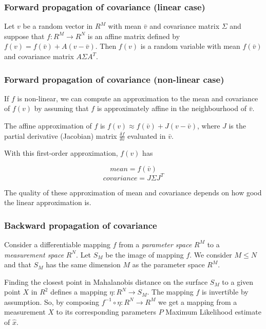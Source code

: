 \subsubsection{Forward propagation of covariance (linear case)}

Let $v$ be a random vector in $R^M$ with mean $\bar{v}$ and covariance matrix $\Sigma$ and suppose that $f : R^M \rightarrow R^N$ is an affine matrix defined by $f(v) = f(\bar{v}) + A(v - \bar{v})$.
Then $f(v)$ is a random variable with mean $f(\bar{v})$ and covariance matrix $A\Sigma A^T$.

\subsubsection{Forward propagation of covariance (non-linear case)}

If $f$ is non-linear, we can compute an approximation to the mean and covariance of $f(v)$ by assuming that $f$ is approximately affine in the neighbourhood of $\bar{v}$.

The affine approximation of $f$ is $f(v) \approx f(\bar{v}) + J(v-\bar{v})$,
where $J$ is the partial derivative (Jacobian) matrix $\frac{\delta f}{\delta v}$ evaluated in $\bar{v}$.

With this first-order approximation, $f(v)$ has

\begin{equation}
mean = f(\bar{v})
\end{equation}
\begin{equation}
covariance = J\Sigma J^T
\end{equation}


The quality of these approximation of mean and covariance depends on how good the linear approximation is.


\subsubsection{Backward propagation of covariance}

Consider a differentiable mapping $f$ from a \textit{parameter space} $R^M$ to a \textit{measurement space} $R^N$. Let $S_M$ be the image of mapping $f$. We consider $M\le N$ and that $S_M$ has the same dimension $M$ as the parameter space $R^M$.

Finding the closest point in Mahalanobis distance on the surface $S_M$ to a given point $X$ in $R^2$ defines a mapping $\eta : R^N \rightarrow S_M$.
The mapping $f$ is invertible by assumption.
So, by composing $f^{-1} \circ \eta : R^N \rightarrow R^M$ we get a mapping from a measurement $X$ to its corresponding parameters $P$ Maximum Likelihood estimate of $\hat{x}$.

